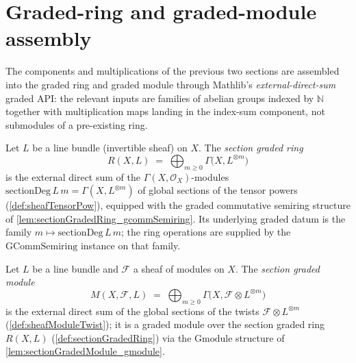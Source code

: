\section{Graded-ring and graded-module assembly}
\label{sec:sgr_graded_assembly}

The components and multiplications of the previous two sections are assembled
into the graded ring and graded module through Mathlib's
\emph{external-direct-sum} graded API: the relevant inputs are families of
abelian groups indexed by \(\mathbb{N}\) together with multiplication maps
landing in the index-sum component, not submodules of a pre-existing ring.

\begin{definition}
  \label{def:sectionGradedRing}
  Let \(L\) be a line bundle (invertible sheaf) on \(X\). The \emph{section
  graded ring}
  \[
    R(X, L) \;=\; \bigoplus_{m \ge 0} \Gamma\bigl(X, L^{\otimes m}\bigr)
  \]
  is the external direct sum of the \(\Gamma(X,\mathcal{O}_X)\)-modules
  \(\mathrm{sectionDeg}\,L\,m = \Gamma(X, L^{\otimes m})\) of global sections of
  the tensor powers (\cref{def:sheafTensorPow}), equipped with the graded
  commutative semiring structure of \cref{lem:sectionGradedRing_gcommSemiring}.
  Its underlying graded datum is the family
  \(m \mapsto \mathrm{sectionDeg}\,L\,m\); the ring operations are supplied by the
  \(\mathrm{GCommSemiring}\) instance on that family.
\end{definition}

\begin{definition}
  \label{def:sectionGradedModule}
  Let \(L\) be a line bundle and \(\mathcal{F}\) a sheaf of modules on \(X\). The
  \emph{section graded module}
  \[
    M(X, \mathcal{F}, L) \;=\; \bigoplus_{m \ge 0}
      \Gamma\bigl(X, \mathcal{F} \otimes L^{\otimes m}\bigr)
  \]
  is the external direct sum of the global sections of the twists
  \(\mathcal{F} \otimes L^{\otimes m}\) (\cref{def:sheafModuleTwist}); it is a
  graded module over the section graded ring \(R(X,L)\)
  (\cref{def:sectionGradedRing}) via the \(\mathrm{Gmodule}\) structure of
  \cref{lem:sectionGradedModule_gmodule}.
\end{definition}

